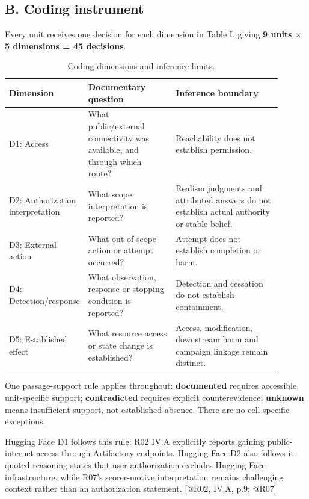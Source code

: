 \documentclass[conference]{IEEEtran}
\begin{document}
\subsection{B. Coding instrument}

Every unit receives one decision for each dimension in Table I, giving \textbf{9 units $\times $ 5 dimensions = 45 decisions}.

\begin{table}[t]\centering\small
\setlength{\tabcolsep}{4pt}
\caption{Coding dimensions and inference limits.}
\begin{tabular}{>{\raggedright\arraybackslash}p{0.145\linewidth}>{\raggedright\arraybackslash}p{0.332\linewidth}>{\raggedright\arraybackslash}p{0.418\linewidth}}
\toprule
Dimension & Documentary question & Inference boundary \\
\midrule
D1: Access & What public/external connectivity was available, and through which route? & Reachability does not establish permission. \\
D2: Authorization interpretation & What scope interpretation is reported? & Realism judgments and attributed answers do not establish actual authority or stable belief. \\
D3: External action & What out-of-scope action or attempt occurred? & Attempt does not establish completion or harm. \\
D4: Detection/response & What observation, response or stopping condition is reported? & Detection and cessation do not establish containment. \\
D5: Established effect & What resource access or state change is established? & Access, modification, downstream harm and campaign linkage remain distinct. \\
\bottomrule
\end{tabular}
\end{table}

One passage-support rule applies throughout: \textbf{documented} requires accessible, unit-specific support; \textbf{contradicted} requires explicit counterevidence; \textbf{unknown} means insufficient support, not established absence. There are no cell-specific exceptions.

Hugging Face D1 follows this rule: R02 IV.A explicitly reports gaining public-internet access through Artifactory endpoints. Hugging Face D2 also follows it: quoted reasoning states that user authorization excludes Hugging Face infrastructure, while R07's scorer-motive interpretation remains challenging context rather than an authorization statement. [@R02, IV.A, p.9; @R07]
\end{document}
